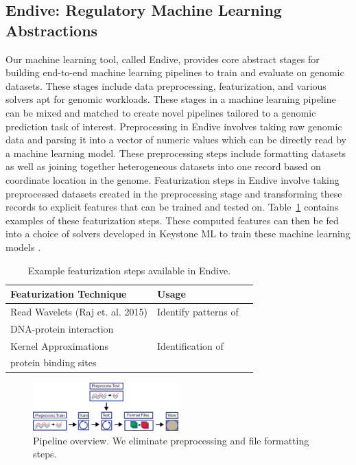 \documentclass{sig-alternate-05-2015}
\begin{document}
\subsection{Endive: Regulatory Machine Learning Abstractions}
Our machine learning tool, called Endive, provides core abstract stages for building end-to-end machine learning pipelines to train and evaluate on genomic datasets. These stages include data preprocessing, featurization, and various solvers apt for genomic workloads. These stages in a machine learning pipeline can be mixed and matched to create novel pipelines tailored to a genomic prediction task of interest.
Preprocessing in Endive involves taking raw genomic data and parsing it into a vector of numeric values which can be directly read by a machine learning model. These preprocessing steps include formatting datasets as well as joining together heterogeneous datasets into one record based on coordinate location in the genome.
Featurization steps in Endive involve taking preprocessed datasets created in the preprocessing stage and transforming these records to explicit features that can be trained and tested on. Table~\ref{table:featurization} contains examples of these featurization steps. These computed features can then be fed into a choice of solvers developed in Keystone ML to train these machine learning models \cite{keystone}.

\begin{table}
\centering
\caption{Example featurization steps available in Endive.}
\label{table:featurization}
\begin{tabular}{|l|l|l|}
\hline
\textbf{Featurization Technique} & \textbf{Usage} \\
\hline
Read Wavelets (Raj et. al. 2015) & Identify patterns of \\ DNA-protein interaction \\ \hline
Kernel Approximations & Identification of  \\ protein binding sites \\ \hline
\end{tabular}
\end{table}


\begin{figure}
  \label{fig:pipeline}
  \includegraphics[width=0.5\textwidth]{figures/ourpipeline.png}
  \caption{Pipeline overview. We eliminate preprocessing and file formatting steps.}
\end{figure}
\end{document}
